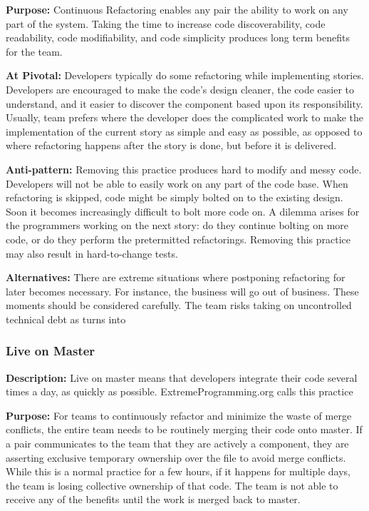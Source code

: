\begin{table}[]

\textbf{Purpose:} Continuous Refactoring enables any pair the ability to work on any part of the system. Taking the time to increase code discoverability, code readability, code modifiability, and code simplicity produces long term benefits for the team. 

\textbf{At Pivotal:} Developers typically do some refactoring while implementing stories. Developers are encouraged to make the code's design cleaner, the code easier to understand, and it easier to discover the component based upon its responsibility. Usually, team prefers  where the developer does the complicated work to make the implementation of the current story as simple and easy as possible, as opposed to  where refactoring happens after the story is done, but before it is delivered.  

\textbf{Anti-pattern:} Removing this practice produces hard to modify and messy code. Developers will not be able to easily work on any part of the code base. When refactoring is skipped, code might be simply bolted on to the existing design. Soon it becomes increasingly difficult to bolt more code on. A dilemma arises for the programmers working on the next story: do they continue bolting on more code, or do they perform the pretermitted refactorings. Removing this practice may also result in hard-to-change tests.

\textbf{Alternatives:} There are extreme situations where postponing refactoring for later becomes necessary. For instance, the business will go out of business. These moments should be considered carefully. The team risks taking on uncontrolled technical debt as  turns into  

\subsubsection{Live on Master}
\textbf{Description:} Live on master means that developers integrate their code several times a day, as quickly as possible. ExtremeProgramming.org calls this practice  \cite{IntegrateOften} 

\textbf{Purpose:} For teams to continuously refactor and minimize the waste of merge conflicts, the entire team needs to be routinely merging their code onto master.  If a pair communicates to the team that they are actively  a component, they are asserting exclusive temporary ownership over the file to avoid merge conflicts. While this is a normal practice for a few hours, if it happens for multiple days, the team is losing collective ownership of that code. The team is not able to receive any of the benefits until the work is merged back to master. 


\end{table}
